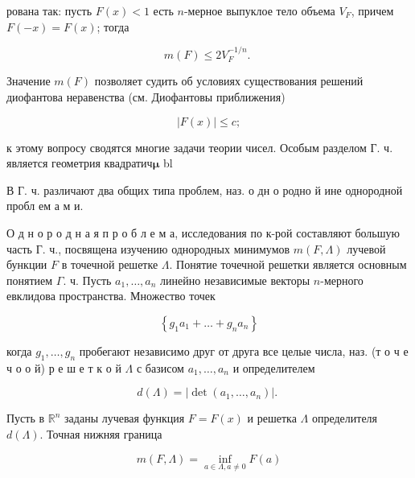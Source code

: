 \documentclass[10pt]{article}
\begin{document}
рована так: пусть $F(x)<1$ есть $n$-мерное выпуклое тело объема $V_{F}$, причем $F(-x)=F(x)$; тогда



\[

m(F) \leqslant 2 V_{F}^{-1 / n} \text {. }

\]



Значение $m(F)$ позволяет судить об условиях существования решений диофантова неравенства (см. Диофантовы приближения)



\[

|F(x)| \leqslant c ;

\]



к этому вопросу сводятся многие задачи теории чисел. Особым разделом Г. ч. является геометрия квадратич$\boldsymbol{\mu}$ bl



В Г. ч. различают два общих типа проблем, наз. о дн о родно й ине однородной пробл ем а м и.



О д н о р о д н а я п р о б л е м а, исследования по к-рой составляют большую часть Г. ч., посвящена изучению однородных минимумов $m(F, \Lambda)$ лучевой бункции $F$ в точечной решетке $\Lambda$. Понятие точечной решетки является основным понятием $\Gamma$. ч. Пусть $a_{1}, \ldots, a_{n}$ линейно независимые векторы $n$-мерного евклидова пространства. Множество точек



\[

\left\{g_{1} a_{1}+\ldots+g_{n} a_{n}\right\}

\]



когда $g_{1}, \ldots, g_{n}$ пробегают независимо друг от друга все целые числа, наз. (т о ч е ч о о й) р е ш е т к о й $\Lambda$ с базисом $a_{1}, \ldots, a_{n}$ и определителем



\[

d(\Lambda)=\left|\operatorname{det}\left(a_{1}, \ldots, a_{n}\right)\right| \text {. }

\]



Пусть в $\mathbb{R}^{n}$ заданы лучевая функция $F=F(x)$ и решетка $\Lambda$ определителя $d(\Lambda)$. Точная нижняя граница



\[

m(F, \Lambda)=\inf _{a \in \Lambda, a \neq 0} F(a)

\]
\end{document}

